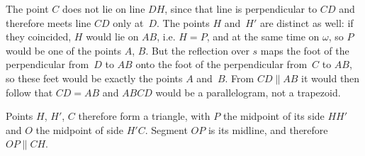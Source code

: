 {    The point $C$ does not lie on line $DH$, since that line is perpendicular to $CD$ and therefore meets line $CD$ only at~$D$. The points $H$ and~$H'$ are distinct as well: if they coincided, $H$ would lie on $AB$, i.e. $H = P$, and at the same time on $\omega$, so $P$ would be one of the points $A$, $B$. But the reflection over $s$ maps the foot of the perpendicular from~$D$ to $AB$ onto the foot of the perpendicular from~$C$ to $AB$, so these feet would be exactly the points $A$ and~$B$. From $CD \parallel AB$ it would then follow that $CD = AB$ and $ABCD$ would be a parallelogram, not a trapezoid.

    Points $H$, $H'$, $C$ therefore form a triangle, with $P$ the midpoint of its side $HH'$ and $O$ the midpoint of side $H'C$. Segment $OP$ is its midline, and therefore $OP \parallel CH$.
}

